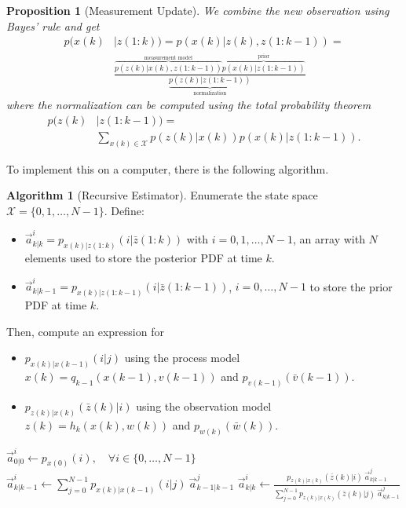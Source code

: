 \documentclass[margin=small]{hsrzf}
\theoremstyle{plain}
\newtheorem{prop}{Proposition}[section]
\theoremstyle{definition}
\newtheorem{alg}{Algorithm}[section]
\theoremstyle{remark}
\begin{document}
\begin{prop}[Measurement Update]
  We combine the new observation using Bayes' rule and get
  \begin{align*}
    p(x(k) &| z(1:k)) = p(x(k) | z(k), z(1:k-1)) = \\
      &\frac{
        \overbrace{p(z(k) | x(k), z(1:k-1))}^{\text{measurement model}}
        \overbrace{p(x(k) | z(1:k-1))}^{\text{prior}}
      }{\underbrace{p(z(k) | z(1:k-1))}_\text{normalization}}
  \end{align*}
  where the normalization can be computed using the total probability theorem
  \begin{align*}
    p(z(k) &| z(1:k-1)) =  \\
      &\sum_{x(k) \in \mathcal{X}} p(z(k) | x(k)) p(x(k) | z(1: k-1)).
  \end{align*}
\end{prop}

To implement this on a computer, there is the following algorithm.

\begin{alg}[Recursive Estimator]
  Enumerate the state space $\mathcal{X} = \{0,1, \ldots, N-1\}$. Define:
  \begin{itemize}
    \item $\vec{a}^i_{k|k} = p_{x(k) | z(1:k)}(i | \bar{z}(1:k))$ with
      $i=0,1,\ldots,N-1$, an array with $N$ elements used to store the
      posterior PDF at time $k$. 
    \item $\vec{a}^i_{k|k-1} = p_{x(k) | z(1:k-1)}(i | \bar{z}(1:k-1))$,
      $i=0,\ldots,N-1$ to store the prior PDF at time $k$.
  \end{itemize}
  Then, compute an expression for
  \begin{itemize}
    \item $p_{x(k)|x(k-1)}(i|j)$ using the process model $x(k) =
      q_{k-1}(x(k-1), v(k-1))$ and $p_{v(k-1)}(\bar{v}(k-1))$.
    \item $p_{z(k)|x(k)}(\bar{z}(k)|i)$ using the observation model $z(k) =
      h_k(x(k),w(k))$ and $p_{w(k)}(\bar{w}(k))$.
  \end{itemize}
  \begin{algorithmic}
      \State{}
      \State \(\vec{a}^i_{0|0} \gets p_{x(0)}(i), \quad 
          \forall i \in \{0,\ldots,N-1\}
        \)
      \Loop
          \State{}
          \State \(
              \displaystyle \vec{a}^i_{k|k-1} \gets 
              \sum_{j=0}^{N-1} p_{x(k)|x(k-1)}(i | j) ~ \vec{a}^j_{k-1|k-1}
            \)
          \State{}
          \State \(
              \displaystyle \vec{a}^i_{k|k} \gets 
              \frac{p_{z(k)|x(k)}(\bar{z}(k)|i) ~ \vec{a}^j_{k|k-1}}
              {\displaystyle \sum_{j=0}^{N-1} 
                p_{z(k)|x(k)}(\bar{z}(k)|j) ~ \vec{a}^j_{k|k-1}}
            \)
        \EndFor
      \EndLoop
    \EndProcedure
  \end{algorithmic}
\end{alg}
\end{document}
